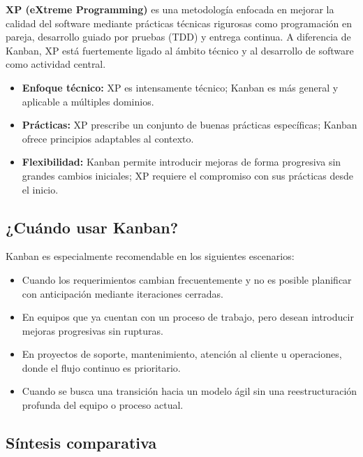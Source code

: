 \textbf{XP (eXtreme Programming)} es una metodología enfocada en mejorar la calidad del software mediante prácticas técnicas rigurosas como programación en pareja, desarrollo guiado por pruebas (TDD) y entrega continua. A diferencia de Kanban, XP está fuertemente ligado al ámbito técnico y al desarrollo de software como actividad central.

\begin{itemize}
    \item \textbf{Enfoque técnico:} XP es intensamente técnico; Kanban es más general y aplicable a múltiples dominios.
    \item \textbf{Prácticas:} XP prescribe un conjunto de buenas prácticas específicas; Kanban ofrece principios adaptables al contexto.
    \item \textbf{Flexibilidad:} Kanban permite introducir mejoras de forma progresiva sin grandes cambios iniciales; XP requiere el compromiso con sus prácticas desde el inicio.
\end{itemize}

\subsection{¿Cuándo usar Kanban?}

Kanban es especialmente recomendable en los siguientes escenarios:

\begin{itemize}
    \item Cuando los requerimientos cambian frecuentemente y no es posible planificar con anticipación mediante iteraciones cerradas.
    \item En equipos que ya cuentan con un proceso de trabajo, pero desean introducir mejoras progresivas sin rupturas.
    \item En proyectos de soporte, mantenimiento, atención al cliente u operaciones, donde el flujo continuo es prioritario.
    \item Cuando se busca una transición hacia un modelo ágil sin una reestructuración profunda del equipo o proceso actual.
\end{itemize}

\subsection{Síntesis comparativa}

